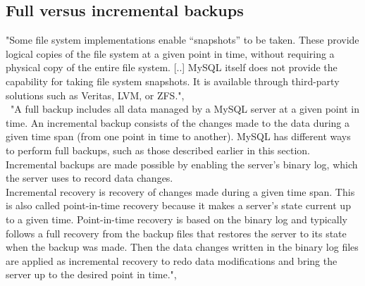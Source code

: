 \documentclass[10pt]{article}
\begin{document}
\subsection{Full versus incremental backups}
"Some file system implementations enable “snapshots” to be taken. These provide logical copies of the file system at a given point in time, without requiring a physical copy of the entire file system. [..] MySQL itself does not provide the capability for taking file system snapshots. It is available through third-party solutions such as Veritas, LVM, or ZFS.", \cite{mysqlbackupandrectypesman}
\\ \
"A full backup includes all data managed by a MySQL server at a given point in time. An incremental backup consists of the changes made to the data during a given time span (from one point in time to another). MySQL has different ways to perform full backups, such as those described earlier in this section. Incremental backups are made possible by enabling the server's binary log, which the server uses to record data changes. \\
Incremental recovery is recovery of changes made during a given time span. This is also called point-in-time recovery because it makes a server's state current up to a given time. Point-in-time recovery is based on the binary log and typically follows a full recovery from the backup files that restores the server to its state when the backup was made. Then the data changes written in the binary log files are applied as incremental recovery to redo data modifications and bring the server up to the desired point in time.", \cite{mysqlbackupandrectypesman}


\end{document}
